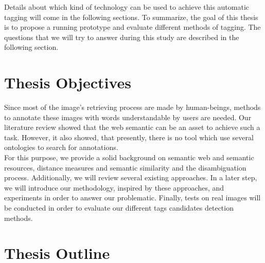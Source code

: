 Details about which kind of technology can be 	used to achieve this automatic tagging will come in the following sections. To summarize, the goal of this thesis is to propose a running prototype and evaluate different methods of tagging. The questions that we will try to answer during this study are described in the following section.


\section{Thesis Objectives} %
\label{sec:thesis_objectives}
Since most of the image's retrieving process are made by human-beings, methods to annotate these images with words understandable by users are needed. Our literature review showed that the web semantic can be an asset to achieve such a task. However, it also showed, that presently, there is no tool which use several ontologies to search for annotations.\\

For this purpose, we provide a solid background on semantic web and semantic resources, distance measures and semantic similarity  and the disambiguation process. Additionally, we will review several existing approaches. In a later step, we will introduce our methodology, inspired by these approaches, and experiments in order to answer our problematic. Finally, tests on real images will be conducted in order to evaluate our different tags candidates detection methods. 


\section{Thesis Outline} %
\label{sec:thesis_outline}

